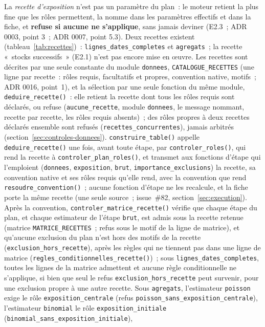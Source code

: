 \documentclass[a4paper,11pt]{article}
\newcommand{\code}[1]{\texttt{\small #1}}
\begin{document}
La \emph{recette d'exposition} n'est pas un paramètre du plan~: le moteur
retient la plus fine que les rôles permettent, la nomme dans les paramètres
effectifs et dans la fiche, et \textbf{refuse si aucune ne s'applique}, sans
jamais deviner (E2.3~; ADR 0003, point 3~; ADR 0007, point 5.3). Deux
recettes existent (tableau~\ref{tab:recettes})~: \code{lignes\_dates\_completes}
et \code{agregats}~; la recette «~stocks successifs~» (E2.1) n'est pas
encore mise en œuvre. Les recettes sont décrites par une seule constante du module
\code{donnees}, \code{CATALOGUE\_RECETTES} (une ligne par recette~: rôles
requis, facultatifs et propres, convention native, motifs~; ADR 0016,
point~1), et la sélection par une seule fonction du même module,
\code{deduire\_recette()}~: elle retient la recette dont tous les rôles
requis sont déclarés, ou refuse (\code{aucune\_recette}, module
\code{donnees}, le message nommant, recette par recette, les rôles requis
absents)~; des rôles propres à deux recettes déclarés ensemble sont refusés
(\code{recettes\_concurrentes}), jamais arbitrés
(section~\ref{sec:controles-donnees}). \code{construire\_table()} appelle
\code{deduire\_recette()} une fois, avant toute étape, par
\code{controler\_roles()}, qui rend la recette à
\code{controler\_plan\_roles()}, et transmet aux fonctions d'étape qui
l'emploient (\code{donnees}, \code{exposition}, \code{brut},
\code{importance\_exclusions}) la recette,
sa convention native et ses rôles requis qu'elle rend, avec la convention
que rend \code{resoudre\_convention()}~; aucune fonction d'étape ne les
recalcule, et la fiche porte la même recette (une seule source~; issue~\#82,
section~\ref{sec:execution}). Après la convention,
\code{controler\_matrice\_recette()} vérifie que chaque étape du plan, et
chaque estimateur de l'étape \code{brut}, est admis sous la recette retenue
(matrice \code{MATRICE\_RECETTES}~; refus sous le motif de la ligne de
matrice), et qu'aucune exclusion du plan n'est hors des motifs de la recette
(\code{exclusion\_hors\_recette}), après les règles qui ne tiennent pas
dans une ligne de matrice (\code{regles\_conditionnelles\_recette()})~; sous
\code{lignes\_dates\_completes}, toutes les lignes de la matrice admettent
et aucune règle conditionnelle ne s'applique, si bien que seul le refus
\code{exclusion\_hors\_recette} peut survenir, pour une exclusion propre à
une autre recette. Sous \code{agregats}, l'estimateur \code{poisson} exige
le rôle \code{exposition\_centrale} (refus
\code{poisson\_sans\_exposition\_centrale}), l'estimateur \code{binomial} le
rôle \code{exposition\_initiale} (\code{binomial\_sans\_exposition\_initiale}),
\end{document}
